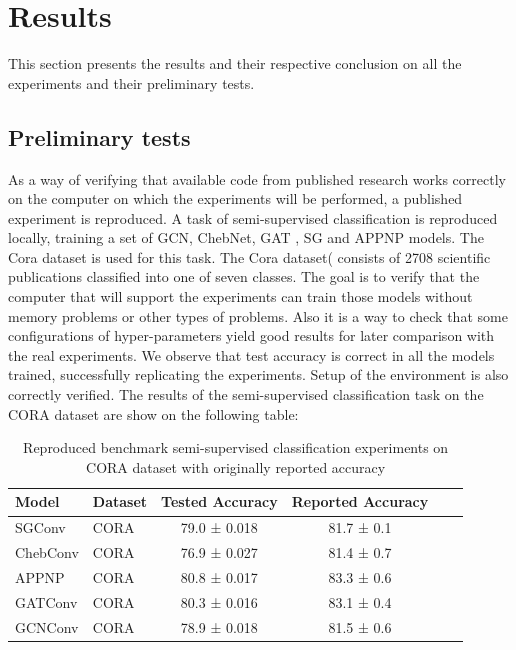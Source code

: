 \newpage
\section{Results}

This section presents the results and their respective conclusion on all the experiments and their preliminary tests.


\subsection{Preliminary tests}



As a way of verifying that available code from published research works correctly on the computer on which the experiments will be performed, a published experiment is reproduced. A task of semi-supervised classification is reproduced locally, training a set of GCN, ChebNet, GAT , SG and APPNP models. The Cora dataset is used for this task.  The Cora dataset(\cite{sen2008collective} consists of 2708 scientific publications classified into one of seven classes. The goal is to verify that the computer that will support the experiments can train those models without memory problems or other types of problems. Also it is a way to check that some configurations of hyper-parameters yield good results for later comparison with the real experiments. We observe that test accuracy is correct in all the models trained, successfully replicating the experiments. Setup of the environment is also correctly verified. The results of the semi-supervised classification task on the CORA dataset are show on the following table:


\begin{table}[H]
\centering
\begin{tabular}{|llccc|c}
\hline
    Model &          Dataset &     Tested Accuracy &   Reported Accuracy \\
\hline
   SGConv &   CORA &      79.0 ± 0.018 &       81.7 ± 0.1\\
 ChebConv &   CORA &      76.9 ± 0.027 &       81.4 ± 0.7\\
    APPNP &   CORA &       80.8 ± 0.017 &       83.3 ± 0.6\\
  GATConv &   CORA &      80.3 ± 0.016 &       83.1 ± 0.4\\
  GCNConv &   CORA &      78.9 ± 0.018 &       81.5 ± 0.6\\
\hline
\end{tabular}
\label{preliminar_GN}\caption{Reproduced benchmark semi-supervised classification experiments on CORA dataset with originally reported accuracy \cite{fey2019fast} }
\end{table}




